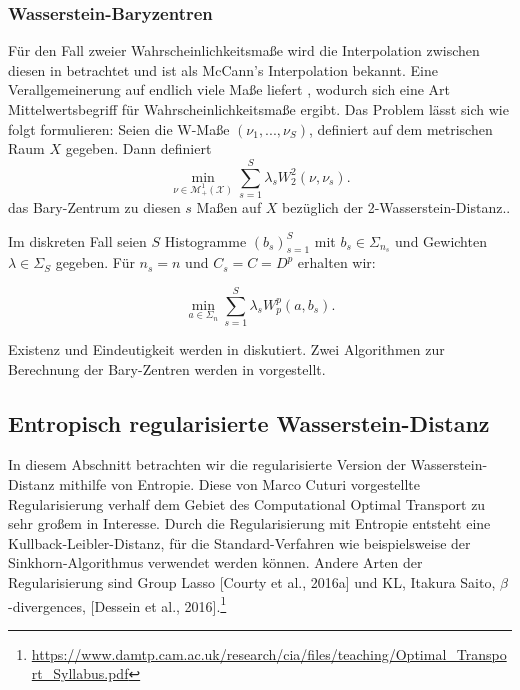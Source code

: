 \documentclass[11pt,a4paper]{article}
\numberwithin{equation}{section}
\begin{document}
	\subsubsection{Wasserstein-Baryzentren}
	Für den Fall zweier Wahrscheinlichkeitsmaße wird die Interpolation zwischen diesen in \cite{maccann} betrachtet und ist als McCann's Interpolation bekannt. Eine Verallgemeinerung auf endlich viele Maße liefert \cite{bary_wasserstein_space}, wodurch sich eine Art Mittelwertsbegriff für Wahrscheinlichkeitsmaße ergibt. Das Problem lässt sich wie folgt formulieren:
	Seien die W-Maße $(\nu_1,...,\nu_S)$, definiert auf dem metrischen Raum $X$ gegeben. Dann definiert
	\begin{equation}
		\min_{\nu \in \mathcal{M}_+^1(\mathcal{X})}{{\sum_{s=1}^S{\lambda_s W_2^2(\nu , \nu_s)}}}.
	\end{equation}
	das Bary-Zentrum zu diesen $s$ Maßen auf $X$ bezüglich der 2-Wasserstein-Distanz..
	
	Im diskreten Fall seien $S$ Histogramme $(b_s)_{s=1}^S$ mit $b_s \in \Sigma_{n_s}$ und Gewichten $\lambda \in \Sigma_S$ gegeben. Für $n_s=n$ und $C_s=C=D^p$ erhalten wir:
	
	\begin{equation}
		\min_{a \in \Sigma_n}{\sum_{s=1}^S \lambda_s{W_p^p(a,b_s)}}.
	\end{equation}
	
	Existenz und Eindeutigkeit werden in \cite{bary_wasserstein_space} diskutiert.
	Zwei Algorithmen zur Berechnung der Bary-Zentren werden in \cite{carlier2015numerical} vorgestellt.
	

	
	\subsection{Entropisch regularisierte Wasserstein-Distanz}
	In diesem Abschnitt betrachten wir die regularisierte Version der Wasserstein-Distanz mithilfe von Entropie. 
	Diese von Marco Cuturi vorgestellte Regularisierung \cite{cuturi2013sinkhorn} verhalf dem Gebiet des Computational Optimal Transport zu sehr großem in Interesse. Durch die Regularisierung mit Entropie entsteht eine Kullback-Leibler-Distanz, für die Standard-Verfahren wie beispielsweise der Sinkhorn-Algorithmus verwendet werden können.
	Andere Arten der Regularisierung sind Group Lasso [Courty et al., 2016a] und KL, Itakura Saito, $\beta$-divergences,
	[Dessein et al., 2016].\footnote{\url{https://www.damtp.cam.ac.uk/research/cia/files/teaching/Optimal_Transport_Syllabus.pdf}}\\
	
\end{document}
